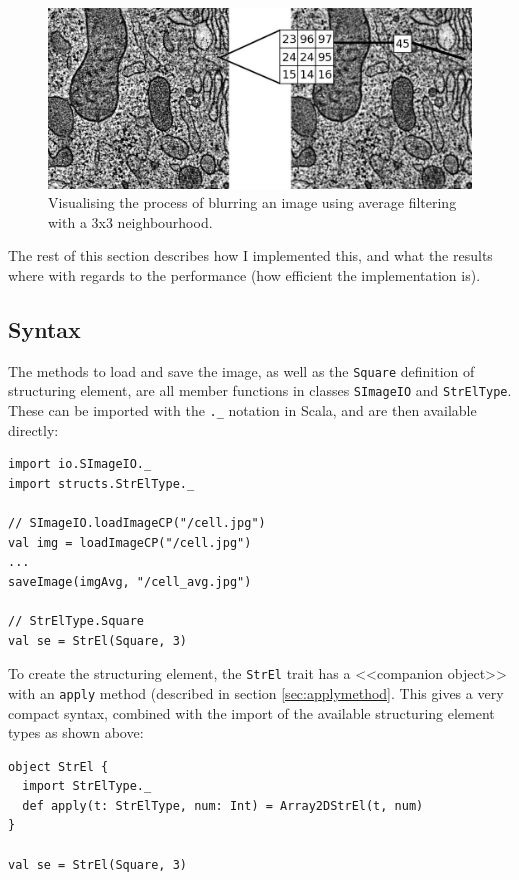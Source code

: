 \documentclass[a4paper,english]{report}
\begin{document}
\begin{figure}
  \includegraphics[width=1.0\textwidth]{images/avg_process}
  \caption{Visualising the process of blurring an image using average
    filtering with a 3x3 neighbourhood.\label{fig:exavg}}
\end{figure}

The rest of this section describes how I implemented this, and what
the results where with regards to the performance (how efficient the
implementation is).

\subsection{Syntax}

The methods to load and save the image, as well as the \texttt{Square}
definition of structuring element, are all member functions in classes
\texttt{SImageIO} and \texttt{StrElType}. These can be imported with
the \texttt{.\_} notation in Scala, and are then available directly:

\begin{lstlisting}
import io.SImageIO._
import structs.StrElType._

// SImageIO.loadImageCP("/cell.jpg")
val img = loadImageCP("/cell.jpg")
...
saveImage(imgAvg, "/cell_avg.jpg")

// StrElType.Square
val se = StrEl(Square, 3)
\end{lstlisting}

To create the structuring element, the \texttt{StrEl} trait has a
<<companion object>> with an \texttt{apply} method (described in
section \vref{sec:applymethod}. This gives a very compact syntax,
combined with the import of the available structuring element types as
shown above:

\begin{lstlisting}
object StrEl {
  import StrElType._
  def apply(t: StrElType, num: Int) = Array2DStrEl(t, num)
}

val se = StrEl(Square, 3)
\end{lstlisting}
\end{document}
